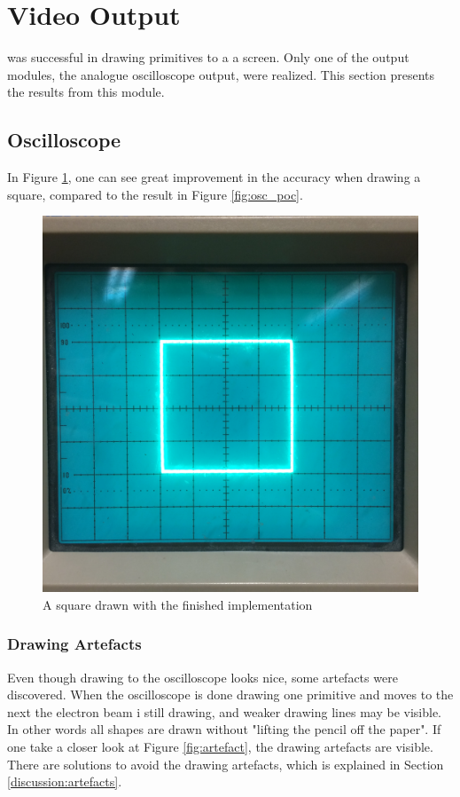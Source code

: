 \section{Video Output}
\vthreek was successful in drawing primitives to a a screen.
Only one of the output modules, the analogue oscilloscope output, were realized.
This section presents the results from this module.

\subsection{Oscilloscope}
In Figure \ref{fig:square}, one can see great improvement in the accuracy when drawing a square, compared to the result in Figure \ref{fig:osc_poc}.

\begin{figure}[h!]
	    \includegraphics[width=\linewidth]{images/square}
	    \caption{A square drawn with the finished implementation}
	    \label{fig:square}
\end{figure}


\subsubsection{Drawing Artefacts}
\label{results:artefacts}
Even though drawing to the oscilloscope looks nice, some artefacts were discovered.
When the oscilloscope is done drawing one primitive and moves to the next the electron beam i still drawing,
and weaker drawing lines may be visible.
In other words all shapes are drawn without "lifting the pencil off the paper".
If one take a closer look at Figure \ref{fig:artefact}, the drawing artefacts are visible.
There are solutions to avoid the drawing artefacts, which is explained in Section \ref{discussion:artefacts}.

